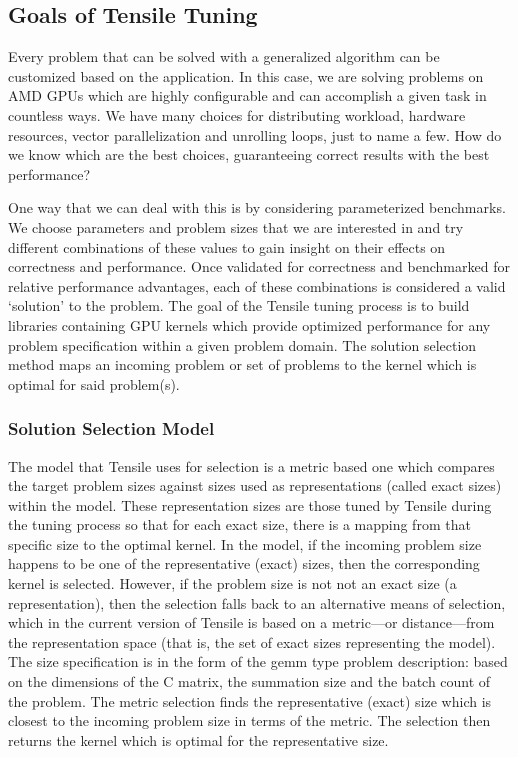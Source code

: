 \documentclass[]{article}
\begin{document}
\subsection{Goals of Tensile Tuning}

Every problem that can be solved with a generalized algorithm can be customized based on the application. In this case, we are solving problems on AMD GPUs which are highly configurable and can accomplish a given task in countless ways. We have many choices for distributing workload, hardware resources, vector parallelization and unrolling loops, just to name a few. How do we know which are the best choices, guaranteeing correct results with the best performance?

One way that we can deal with this is by considering parameterized benchmarks. We choose parameters and problem sizes that we are interested in and try different combinations of these values to gain insight on their effects on correctness and performance. Once validated for correctness and benchmarked for relative performance advantages, each of these combinations is considered a valid `solution' to the problem. The goal of the Tensile tuning process is to build libraries containing GPU kernels which provide optimized performance for any problem specification within a given problem domain. The solution selection method maps an incoming problem or set of problems to the kernel which is optimal for said problem(s).

\subsubsection{Solution Selection Model}

The model that Tensile uses for selection is a metric based one which compares the target problem sizes against sizes used as representations (called exact sizes) within the model. These representation sizes are those tuned by Tensile during the tuning process so that for each exact size, there is a mapping from that specific size to the optimal kernel. In the model, if the incoming problem size happens to be one of the representative (exact) sizes, then the corresponding kernel is selected. However, if the problem size is not not an exact size (a representation), then the selection falls back to an alternative means of selection, which in the current version of Tensile is based on a metric---or distance---from the representation space (that is, the set of exact sizes representing the model). The size specification is in the form of the gemm type problem description: based on the dimensions of the C matrix, the summation size and the batch count of the problem. The metric selection finds the representative (exact) size which is closest to the incoming problem size in terms of the metric. The selection then returns the kernel which is optimal for the representative size.
\end{document}
